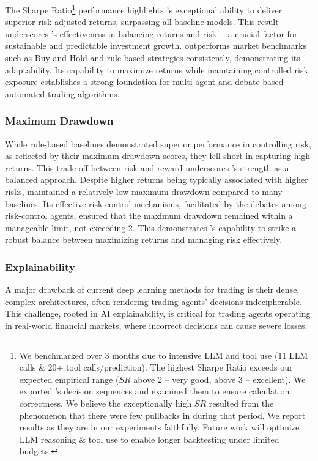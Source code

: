 The Sharpe Ratio\footnote{We benchmarked \model over 3 months due to intensive LLM and tool use (11 LLM calls \& 20+ tool calls/prediction). The highest Sharpe Ratio exceeds our expected empirical range (\(SR\) above 2 -- very good, above 3 -- excellent). We exported \model's decision sequences and examined them to ensure calculation correctness. We believe the exceptionally high \(SR\) resulted from the phenomenon that there were few pullbacks in \model during that period. We report results as they are in our experiments faithfully. Future work will optimize LLM reasoning \& tool use to enable longer backtesting under limited budgets.}
 performance highlights \model's exceptional ability to deliver superior risk-adjusted returns, surpassing all baseline models. This result underscores \model's effectiveness in balancing returns and risk— a crucial factor for sustainable and predictable investment growth. \model outperforms market benchmarks such as Buy-and-Hold and rule-based strategies consistently, demonstrating its adaptability. Its capability to maximize returns while maintaining controlled risk exposure establishes a strong foundation for multi-agent and debate-based automated trading algorithms.

\subsubsection{Maximum Drawdown}
While rule-based baselines demonstrated superior performance in controlling risk, as reflected by their maximum drawdown scores, they fell short in capturing high returns. This trade-off between risk and reward underscores \model's strength as a balanced approach. Despite higher returns being typically associated with higher risks, \model maintained a relatively low maximum drawdown compared to many baselines. Its effective risk-control mechanisms, facilitated by the debates among risk-control agents, ensured that the maximum drawdown remained within a manageable limit, not exceeding 2. This demonstrates \model's capability to strike a robust balance between maximizing returns and managing risk effectively.

\subsubsection{Explainability}
A major drawback of current deep learning methods for trading is their dense, complex architectures, often rendering trading agents' decisions indecipherable. This challenge, rooted in AI explainability, is critical for trading agents operating in real-world financial markets, where incorrect decisions can cause severe losses. 

